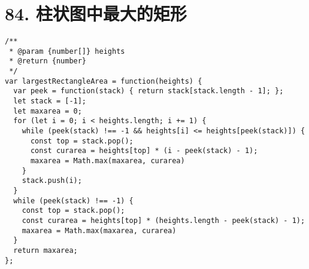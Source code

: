 \newpage
\section{84. 柱状图中最大的矩形}
\label{leetcode:84}

\begin{verbatim}
/**
 * @param {number[]} heights
 * @return {number}
 */
var largestRectangleArea = function(heights) {
  var peek = function(stack) { return stack[stack.length - 1]; };
  let stack = [-1];
  let maxarea = 0;
  for (let i = 0; i < heights.length; i += 1) {
    while (peek(stack) !== -1 && heights[i] <= heights[peek(stack)]) {
      const top = stack.pop();
      const curarea = heights[top] * (i - peek(stack) - 1);
      maxarea = Math.max(maxarea, curarea)
    }
    stack.push(i);
  }
  while (peek(stack) !== -1) {
    const top = stack.pop();
    const curarea = heights[top] * (heights.length - peek(stack) - 1);
    maxarea = Math.max(maxarea, curarea)
  }
  return maxarea;
};
\end{verbatim}
